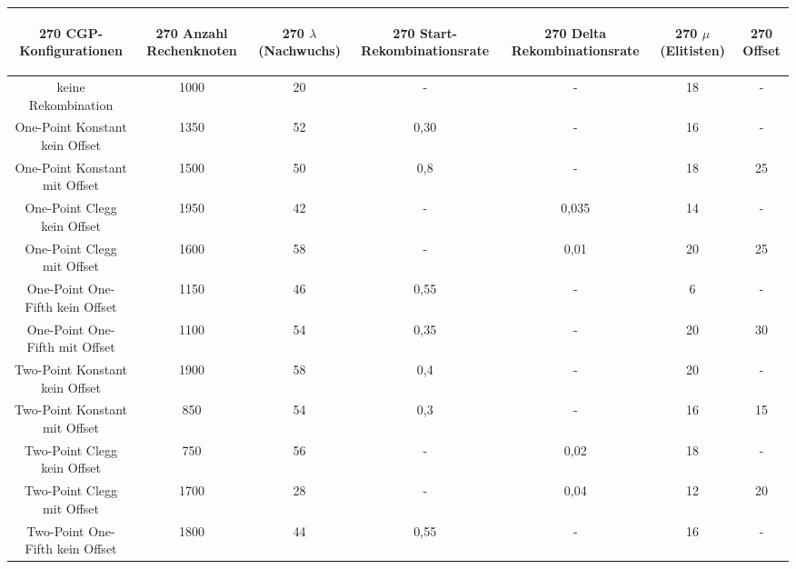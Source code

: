 \begin{table}[H]
	\centering
	\begin{tabular}{c | c | c | c | c | c | c}
		\begin{turn}{270} \textbf{CGP-Konfigurationen} \end{turn} & \begin{turn}{270} \textbf{Anzahl Rechenknoten} \end{turn} & \begin{turn}{270} \textbf{$\lambda$ (Nachwuchs)} \end{turn} & \begin{turn}{270} \textbf{Start-Rekombinationsrate} \end{turn} & \begin{turn}{270} \textbf{Delta Rekombinationsrate} \end{turn} & \begin{turn}{270} \textbf{$\mu$ (Elitisten)} \end{turn} & \begin{turn}{270} \textbf{Offset} \end{turn}\\
		\hline
		keine Rekombination & 1000 & 20 & - & - & 18 & -\\
		\hline
		One-Point Konstant kein Offset & 1350 & 52 & 0,30 & - & 16 & - \\
		\hline
		One-Point Konstant mit Offset & 1500 & 50 & 0,8 & - & 18 & 25 \\
		\hline
		One-Point Clegg kein Offset & 1950 & 42 & - & 0,035 & 14 & - \\
		\hline
		One-Point Clegg mit Offset & 1600 & 58 & - & 0,01 & 20 & 25 \\
		\hline
		One-Point One-Fifth kein Offset & 1150 & 46 & 0,55 & - & 6 & - \\
		\hline
		One-Point One-Fifth mit Offset & 1100 & 54 & 0,35 & - & 20 & \color{red}30\color{black} \\
		\hline
		Two-Point Konstant kein Offset & 1900 & 58 & 0,4 & - & 20 & - \\
		\hline
		Two-Point Konstant mit Offset & 850 & 54 & 0,3 & - & 16 & 15 \\
		\hline
		Two-Point Clegg kein Offset & 750 & 56 & - & 0,02 & 18 & - \\
		\hline
		Two-Point Clegg mit Offset & 1700 & 28 & - & 0,04 & 12 & \color{red}20\color{black} \\
		\hline
		Two-Point One-Fifth kein Offset & 1800 & 44 & 0,55 & - & 16 & - \\
		\hline

\end{tabular}
\end{table}
